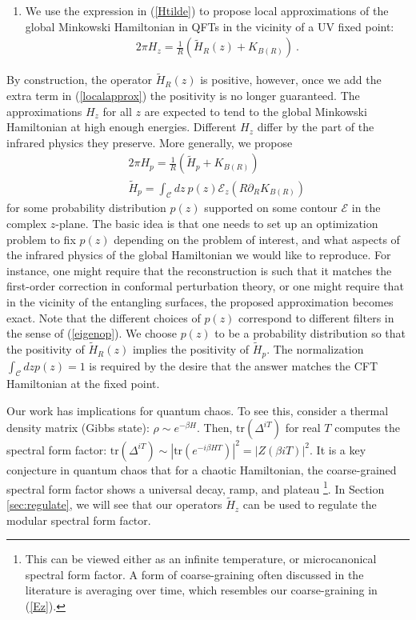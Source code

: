 \documentclass[a4paper,11pt]{article}
\theoremstyle{definition}
\newcommand{\nn}{\nonumber}
\newcommand{\lb}{\left(}
\newcommand{\rb}{\right)}
\newcommand{\p}{\partial}
\newcommand{\tr}{\text{tr}}
\begin{document}
\begin{enumerate}
    
  \item  We use the expression in (\ref{Htilde}) to propose local approximations of the global Minkowski Hamiltonian in QFTs in the vicinity of a UV fixed point:
    \begin{eqnarray}\label{localapprox}
        2\pi H_z=\frac{1}{R}\lb \tilde{H}_R(z)+ K_{B(R)}\rb\ .
    \end{eqnarray}
\end{enumerate}
By construction, the operator $\tilde{H}_R(z)$ is positive, however, once we add the extra term in (\ref{localapprox}) the positivity is no longer guaranteed. The approximations $H_z$ for all $z$ are expected to tend to the global Minkowski Hamiltonian at high enough energies. Different $H_z$ differ by the part of the infrared physics they preserve. More generally, we propose 
\begin{eqnarray}\label{averagemeasure}
&& 2\pi H_p=\frac{1}{R}\lb \tilde{H}_p+K_{B(R)}\rb\nn\\
&&    \tilde{H}_p=\int_\mathcal{C} dz \: p(z) \mathcal{E}_z(R\p_R K_{B(R)})
\end{eqnarray}
for some probability distribution $p(z)$ supported on some contour $\mathcal{E}$ in the complex $z$-plane.  The basic idea is that one needs to set up an optimization problem to fix $p(z)$ depending on the problem of interest, and what aspects of the infrared physics of the global Hamiltonian we would like to reproduce. For instance, one might require that the reconstruction is such that it matches the first-order correction in conformal perturbation theory, or one might require that in the vicinity of the entangling surfaces, the proposed approximation becomes exact. Note that the different choices of $p(z)$ correspond to different filters in the sense of (\ref{eigenop}). We choose $p(z)$ to be a probability distribution so that the positivity of $\tilde{H}_R(z)$ implies the positivity of $\tilde{H}_p$. The normalization $\int_{\mathcal{C}} dz p(z)=1$ is required by the desire that the answer matches the CFT Hamiltonian at the fixed point.


Our work has implications for quantum chaos. To see this, consider a thermal density matrix (Gibbs state): $\rho\sim e^{-\beta H}$. Then, $\tr(\Delta^{i T})$ for real $T$ computes the spectral form factor: $\tr(\Delta^{i T})\sim |\tr(e^{-i\beta H T})|^2=|Z(\beta i T)|^2$. It is a key conjecture in quantum chaos that for a chaotic Hamiltonian, the coarse-grained spectral form factor shows a universal decay, ramp, and plateau \footnote{This can be viewed either as an infinite temperature, or microcanonical spectral form factor. A form of coarse-graining often discussed in the literature is averaging over time, which resembles our coarse-graining in (\ref{Ez}).}. In Section \ref{sec:regulate}, we will see that our operators $\tilde{H}_z$ can be used to regulate the modular spectral form factor.
\end{document}
